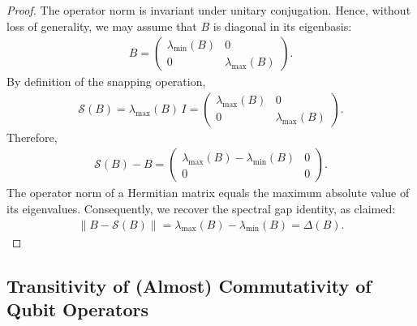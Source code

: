 \documentclass[a4paper,onecolumn,11pt]{quantumarticle}
\theoremstyle{plain}
\begin{document}
\begin{proof}
The operator norm is invariant under unitary conjugation. Hence, without loss of generality, we may assume that $B$ is diagonal in its eigenbasis:
\begin{align}
B =
\begin{pmatrix}
\lambda_{\min}(B) & 0 \\
0 & \lambda_{\max}(B)
\end{pmatrix}.
\end{align}
By definition of the snapping operation,
\begin{align}
\mathcal{S}(B) = \lambda_{\max}(B)\, I =
\begin{pmatrix}
\lambda_{\max}(B) & 0 \\
0 & \lambda_{\max}(B)
\end{pmatrix}.
\end{align}
Therefore,
\begin{align}
\mathcal{S}(B) - B =
\begin{pmatrix}
\lambda_{\max}(B) - \lambda_{\min}(B) & 0 \\
0 & 0
\end{pmatrix}.
\end{align}
The operator norm of a Hermitian matrix equals the maximum absolute value of its eigenvalues. Consequently, we recover the spectral gap identity, as claimed:
\begin{align}
\|B - \mathcal{S}(B)\|
= \lambda_{\max}(B) - \lambda_{\min}(B) = \Delta(B).
\end{align}
\end{proof}

\subsection{Transitivity of (Almost) Commutativity of Qubit Operators}
\end{document}
